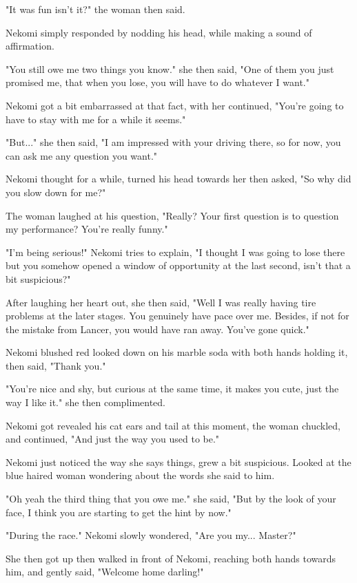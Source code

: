 "It was fun isn't it?" the woman then said.

Nekomi simply responded by nodding his head, while making a sound of affirmation.

"You still owe me two things you know." she then said, "One of them you just promised me, that when you lose, you will have to do whatever I want."

Nekomi got a bit embarrassed at that fact, with her continued, "You're going to have to stay with me for a while it seems."

"But..." she then said, "I am impressed with your driving there, so for now, you can ask me any question you want."

Nekomi thought for a while, turned his head towards her then asked, "So why did you slow down for me?"

The woman laughed at his question, "Really? Your first question is to question my performance? You're really funny."

"I'm being serious!" Nekomi tries to explain, "I thought I was going to lose there but you somehow opened a window of opportunity at the last second, isn't that a bit suspicious?"

After laughing her heart out, she then said, "Well I was really having tire problems at the later stages. You genuinely have pace over me. Besides, if not for the mistake from Lancer, you would have ran away. You've gone quick."

Nekomi blushed red looked down on his marble soda with both hands holding it, then said, "Thank you."

"You're nice and shy, but curious at the same time, it makes you cute, just the way I like it." she then complimented.

Nekomi got revealed his cat ears and tail at this moment, the woman chuckled, and continued, "And just the way you used to be."

Nekomi just noticed the way she says things, grew a bit suspicious. Looked at the blue haired woman wondering about the words she said to him.

"Oh yeah the third thing that you owe me." she said, "But by the look of your face, I think you are starting to get the hint by now."

"During the race." Nekomi slowly wondered, "Are you my... Master?"

She then got up then walked in front of Nekomi, reaching both hands towards him, and gently said, "Welcome home darling!"


